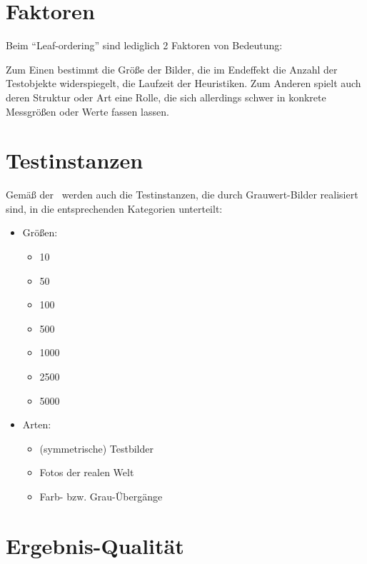 \documentclass[a4paper, 10pt, twoside, onecolumn, parskip]{scrartcl}
\begin{document}
    \section{Faktoren} \label{sec:faktoren}

    Beim \enquote{Leaf-ordering} sind lediglich 2 Faktoren von Bedeutung:

    Zum Einen bestimmt die Größe der Bilder, die im Endeffekt die Anzahl der Testobjekte widerspiegelt, die Laufzeit der Heuristiken.
    Zum Anderen spielt auch deren Struktur oder Art eine Rolle, die sich allerdings schwer in konkrete Messgrößen oder Werte fassen lassen.

    \section{Testinstanzen} \label{sec:testinstanzen}

    Gemäß der~ werden auch die Testinstanzen, die durch Grauwert-Bilder realisiert sind, in die entsprechenden Kategorien unterteilt:
    
    \begin{itemize}
        \item Größen:
        \begin{itemize}
            \item 10
            \item 50
            \item 100
            \item 500
            \item 1000
            \item 2500
            \item 5000
        \end{itemize}
        \item Arten:
        \begin{itemize}
            \item (symmetrische) Testbilder
            \item Fotos der realen Welt
            \item Farb- bzw. Grau-Übergänge
        \end{itemize}
    \end{itemize}

    \section{Ergebnis-Qualität} \label{sec:qualität}
\end{document}
